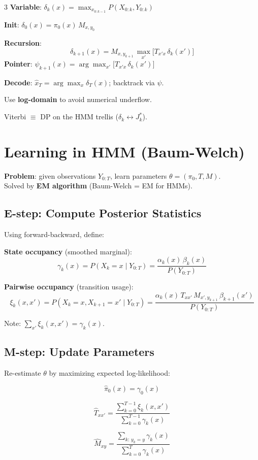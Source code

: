 \documentclass[9pt,landscape]{article}
\begin{document}
\begin{multicols}{3}
\textbf{Variable}: $\delta_k(x)=\max_{x_{0:k-1}}P(X_{0:k},Y_{0:k})$

\textbf{Init}: $\delta_0(x)=\pi_0(x)\,M_{x,y_0}$

\textbf{Recursion}:
\[\boxed{\delta_{k+1}(x)=M_{x,y_{k+1}}\,\max_{x'}\bigl[T_{x'x}\,\delta_k(x')\bigr]}\]
\textbf{Pointer}: $\psi_{k+1}(x)=\arg\max_{x'}\bigl[T_{x'x}\,\delta_k(x')\bigr]$

\textbf{Decode}: $\hat x_T=\arg\max_x\delta_T(x)$; backtrack via $\psi$.

Use \textbf{log-domain} to avoid numerical underflow.

Viterbi $\equiv$ DP on the HMM trellis ($\delta_k\leftrightarrow J_k^*$).

\section{Learning in HMM (Baum-Welch)}

\textbf{Problem}: given observations $Y_{0:T}$, learn parameters $\theta=(\pi_0, T, M)$.\\
Solved by \textbf{EM algorithm} (Baum-Welch = EM for HMMs).

\subsection{E-step: Compute Posterior Statistics}
Using forward-backward, define:

\textbf{State occupancy} (smoothed marginal):
\[\gamma_k(x)=P(X_k=x\mid Y_{0:T})=\frac{\alpha_k(x)\,\beta_k(x)}{P(Y_{0:T})}\]

\textbf{Pairwise occupancy} (transition usage):
\[\xi_k(x,x')=P(X_k=x,X_{k+1}=x'\mid Y_{0:T})=\frac{\alpha_k(x)\,T_{xx'}\,M_{x',y_{k+1}}\,\beta_{k+1}(x')}{P(Y_{0:T})}\]

Note: $\sum_{x'}\xi_k(x,x')=\gamma_k(x)$.

\subsection{M-step: Update Parameters}
Re-estimate $\theta$ by maximizing expected log-likelihood:

\[\hat\pi_0(x)=\gamma_0(x)\]

\[\hat T_{xx'}=\frac{\sum_{k=0}^{T-1}\xi_k(x,x')}{\sum_{k=0}^{T-1}\gamma_k(x)}\]

\[\hat M_{xy}=\frac{\sum_{k:\,y_k=y}\gamma_k(x)}{\sum_{k=0}^{T}\gamma_k(x)}\]


\end{multicols}
\end{document}
